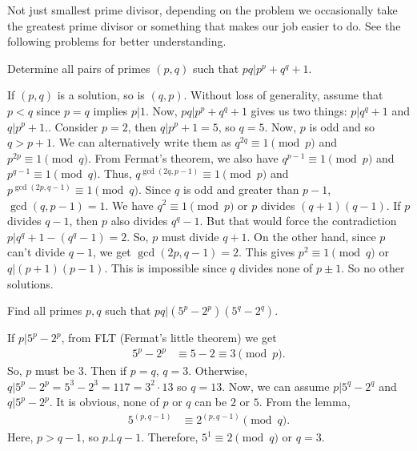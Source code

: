 \documentclass{subfile}
\begin{document}
	\begin{note}
		Not just smallest prime divisor, depending on the problem we occasionally take the greatest prime divisor or something that makes our job easier to do. See the following problems for better understanding.
	\end{note}

		\begin{problem}
			Determine all pairs of primes $(p,q)$ such that $pq|p^p+q^q+1$.
		\end{problem}

		\begin{solution}
			If $(p,q)$ is a solution, so is $(q,p)$. Without loss of generality, assume that $p<q$ since $p=q$ implies $p|1$. Now, $pq|p^p+q^q+1$ gives us two things: $p|q^q+1$ and $q|p^p+1$.. Consider $p=2$, then $q|p^p+1=5$, so $q=5$.
			Now, $p$ is odd and so $q>p+1$. We can alternatively write them as $q^{2q}\equiv1\pmod p$ and $p^{2p}\equiv1\pmod q$. From Fermat's theorem, we also have $q^{p-1}\equiv1\pmod p$ and $p^{q-1}\equiv1\pmod q$. Thus, $q^{\gcd(2q,p-1)}\equiv1\pmod p$ and $p^{\gcd(2p,q-1)}\equiv1\pmod q$. Since $q$ is odd and greater than $p-1$, $\gcd(q,p-1)=1$. We have $q^2\equiv1\pmod p$ or $p$ divides $(q+1)(q-1)$. If $p$ divides $q-1$, then $p$ also divides $q^q-1$. But that would force the contradiction $p|q^q+1-(q^q-1)=2$. So, $p$ must divide $q+1$. On the other hand, since $p$ can't divide $q-1$, we get $\gcd(2p,q-1)=2$. This gives $p^2\equiv1\pmod q$ or $q|(p+1)(p-1)$. This is impossible since $q$ divides none of $p\pm1$. So no other solutions.
		\end{solution}

		\begin{problem}
			Find all primes $p,q$ such that $pq|(5^p-2^p)(5^q-2^q)$.
		\end{problem}

		\begin{solution}
			If  $p|5^p-2^p$, from FLT (Fermat's little theorem) we get
			\begin{align*}
				5^p-2^p &\equiv5-2\equiv3\pmod p.
			\end{align*}
			So, $p$ must be $3$. Then if $p=q$, $q=3$. Otherwise, $q|5^p-2^p=5^3-2^3=117=3^2\cdot13$ so $q=13$.  Now, we can assume $p|5^q-2^q$ and $q|5^p-2^p$. It is obvious, none of $p$ or $q$ can be $2$ or $5$. From the lemma,
			\begin{align*}
				5^{(p,q-1)}&\equiv2^{(p,q-1)}\pmod q.
			\end{align*}
			Here, $p>q-1$, so $p\bot q-1$. Therefore, $5^1\equiv2\pmod q$ or $q=3$.
		\end{solution}
\end{document}
